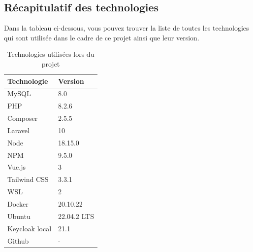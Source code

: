 \subsection{Récapitulatif des technologies}
Dans la tableau ci-dessous, vous pouvez trouver la liste de toutes les technologies qui sont utilisée dans le cadre de ce projet ainsi que leur version.
\begin{table}[h]
    \begin{center}
        \caption{Technologies utilisées lors du projet \label{stack}}
        \begin{tabular}{|l|l|}
            \hline
            \textbf{Technologie} & \textbf{Version} \\
            \hline
            MySQL                & 8.0              \\
            \hline
            PHP                  & 8.2.6            \\
            \hline
            Composer             & 2.5.5            \\
            \hline
            Laravel              & 10               \\
            \hline
            Node                 & 18.15.0          \\
            \hline
            NPM                  & 9.5.0            \\
            \hline
            Vue.js               & 3                \\
            \hline
            Tailwind CSS         & 3.3.1            \\
            \hline
            WSL                  & 2                \\
            \hline
            Docker               & 20.10.22         \\
            \hline
            Ubuntu               & 22.04.2 LTS      \\
            \hline
            Keycloak local       & 21.1             \\
            \hline
            Github               & -                \\
            \hline
        \end{tabular}
    \end{center}
\end{table}